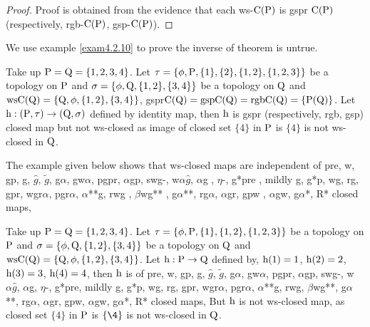 \begin{proof}
Proof is obtained from the evidence that each ws-$\mathrm{C}(\mathrm{P})$ is gspr $\mathrm{C}(\mathrm{P})$ (respectively, rgb-$\mathrm{C}(\mathrm{P})$, gsp-$\mathrm{C}(\mathrm{P})$).
\end{proof}

We use example \ref{exam4.2.10} to prove the inverse of theorem is untrue.

\begin{exm}\label{exam4.2.10} 
Take up $\mathrm{P}=\mathrm{Q}= \{1, 2, 3, 4\}$. Let $\tau= \{\phi, \TSP, \{1\}, \{2\}, \{1, 2\},\break \{1,2,3\}\}$ be a topology on $\mathrm{P}$ and $\sigma=\{\phi, \mathrm{Q}, \{1,2\}, \{3,4 \} \}$ be a topology on $\mathrm{Q}$ and $\mathrm{ws}\mathrm{C}(\mathrm{Q})= \{\mathrm{Q}, \phi, \{1,2\},\{3,4 \}\}$, gspr$\mathrm{C}(\mathrm{Q})=\mathrm{gsp}\mathrm{C}(\mathrm{Q})=\mathrm{rgb}\mathrm{C}(\mathrm{Q})=\{\mathrm{P}(\mathrm{Q})\}$. Let $\mathrm{h}: (\mathrm{P}, \tau) \to (\mathrm{Q},\sigma)$ defined by identity map, then $\mathrm{h}$ is gspr (respectively, rgb, gsp) closed map but not ws-closed as image of closed set $\{4\}$ in $\mathrm{P}$ is $\{4\}$ is not ws-closed in $\mathrm{Q}$.
\end{exm}

\begin{rem}\label{rem4.2.11}
The example given below shows that ws-closed maps are independent of pre, w, gp, g, $\hat{g}$, $\tilde{g}$, g$\alpha$, gw$\alpha$, pgpr, $\alpha$gp, swg-, w$\alpha\hat{g}$, $\alpha$g , $\eta$-, g*pre , mildly g, g*p, wg, rg, gpr, wgr$\alpha$, pgr$\alpha$, $\alpha$**g, rwg , $\beta$wg** , g$\alpha$**, rg$\alpha$, $\alpha$gr, gpw , $\alpha$gw, g$\alpha$*, R* closed maps,
\end{rem}

\begin{exm}\label{exam4.2.12}
Take up $\mathrm{P}=\mathrm{Q}= \{1, 2, 3, 4\}$. Let $\tau= \{\phi, \mathrm{P}, \{1\},\{1, 2\},\{1,2,3\}\}$ be a topology on $\mathrm{P}$ and $\sigma=\{\phi, \mathrm{Q}, \{1,2\}, \{3,4 \}\}$ be a topology on $\mathrm{Q}$ and $\mathrm{ws}\mathrm{C}(\mathrm{Q})= \{\mathrm{Q}, \phi, \{1,2\}, \{3,4 \}\}$. Let $\mathrm{h}: \mathrm{P} \to \mathrm{Q}$ defined by, $\mathrm{h}(1) = 1$, $\mathrm{h}(2) = 2$, $\mathrm{h}(3) = 3$, $\mathrm{h}(4)=4$, then $\mathrm{h}$ is of pre, w, gp, g, $\hat{g}$, $\tilde{g}$, g$\alpha$, gw$\alpha$, pgpr, $\alpha$gp, swg-, w$\alpha\hat{g}$, $\alpha$g, $\eta$-, g*pre, mildly g, g*p, wg, rg, gpr, wgr$\alpha$, pgr$\alpha$, $\alpha$**g, rwg, $\beta$wg**, g$\alpha$**, rg$\alpha$, $\alpha$gr, gpw, $\alpha$gw, g$\alpha$*, R* closed maps, But $\mathrm{h}$ is not ws-closed map, as closed set $\{4\}$ in $\mathrm{P}$ is $\{\4\}$ is not ws-closed in $\mathrm{Q}$.
\end{exm}

